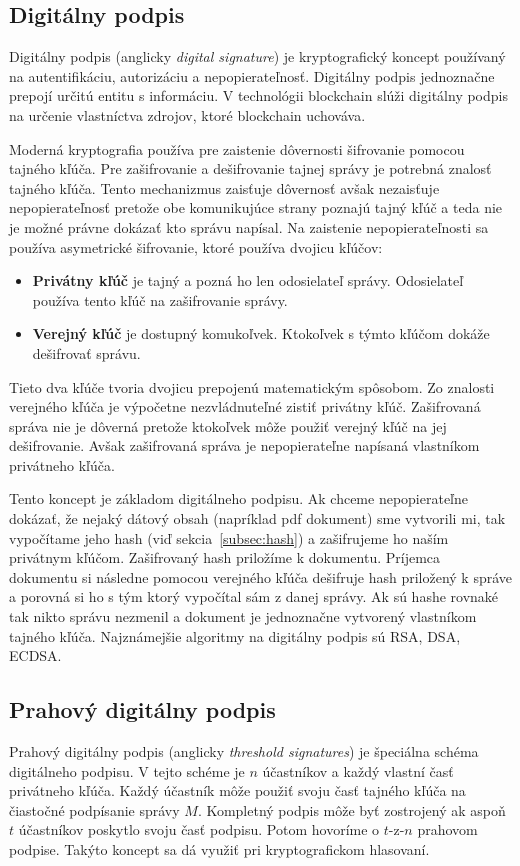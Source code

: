 \subsection{Digitálny podpis}\label{subsec:sign}
Digitálny podpis (anglicky \textit{digital signature}) je kryptografický koncept používaný na autentifikáciu, autorizáciu a nepopierateľnosť. Digitálny podpis jednoznačne prepojí určitú entitu s informáciu. V technológii blockchain slúži digitálny podpis na určenie vlastníctva zdrojov, ktoré blockchain uchováva.~\cite{cryptoHandbook, satoshiBitcoin}

Moderná kryptografia používa pre zaistenie dôvernosti šifrovanie pomocou tajného kľúča. Pre zašifrovanie a dešifrovanie tajnej správy je potrebná znalosť tajného kľúča. Tento mechanizmus  zaisťuje dôvernosť avšak nezaisťuje nepopierateľnosť pretože obe komunikujúce strany poznajú tajný kľúč a teda nie je možné právne dokázať kto správu napísal. Na zaistenie nepopierateľnosti sa používa asymetrické šifrovanie, ktoré používa dvojicu kľúčov:
\begin{itemize}
	\item \textbf{Privátny kľúč} je tajný a pozná ho len odosielateľ správy. Odosielateľ používa tento kľúč na zašifrovanie správy.
	\item \textbf{Verejný kľúč} je dostupný komukoľvek. Ktokoľvek s týmto kľúčom dokáže dešifrovať správu.
\end{itemize}
Tieto dva kľúče tvoria dvojicu prepojenú matematickým spôsobom. Zo znalosti verejného kľúča je výpočetne nezvládnuteľné zistiť privátny kľúč. Zašifrovaná správa nie je dôverná pretože ktokoľvek môže použiť verejný kľúč na jej dešifrovanie. Avšak zašifrovaná správa je nepopierateľne napísaná vlastníkom privátneho kľúča. 

Tento koncept je základom digitálneho podpisu. Ak chceme nepopierateľne dokázať, že nejaký dátový obsah (napríklad pdf dokument) sme vytvorili mi, tak vypočítame jeho hash (viď sekcia~\ref{subsec:hash}) a zašifrujeme ho naším privátnym kľúčom. Zašifrovaný hash priložíme k dokumentu. Príjemca dokumentu si následne pomocou verejného kľúča dešifruje hash priložený k správe a porovná si ho s tým ktorý vypočítal sám z danej správy. Ak sú hashe rovnaké tak nikto správu nezmenil a dokument je jednoznačne vytvorený vlastníkom tajného kľúča. Najznámejšie algoritmy na digitálny podpis sú RSA, DSA, ECDSA.~\cite{cryptoHandbook}

\subsection{Prahový digitálny podpis}\label{subsec:threshold-sig}
Prahový digitálny podpis (anglicky \textit{threshold signatures}) je špeciálna schéma digitálneho podpisu. V tejto schéme je $n$ účastníkov a každý vlastní časť privátneho kľúča. Každý účastník môže použiť svoju časť tajného kľúča na čiastočné podpísanie správy $M$. Kompletný podpis môže byť zostrojený ak aspoň $t$ účastníkov poskytlo svoju časť podpisu. Potom hovoríme o  $t$-z-$n$ prahovom podpise. Takýto koncept sa dá využiť pri kryptografickom hlasovaní.~\cite{blsSignature}


